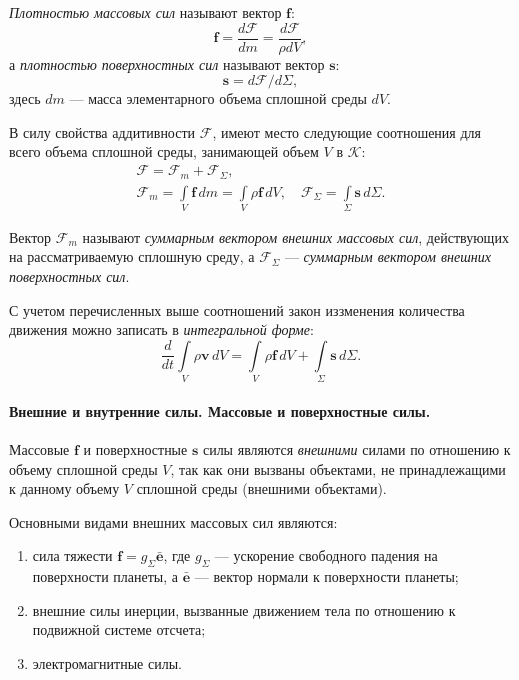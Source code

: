 \begin{definition*}
	\textit{Плотностью массовых сил} называют вектор $\mathbf{f}$:
	\begin{equation*}
		\mathbf{f} = \frac{d\mathcal{F}}{dm} = \frac{d\mathcal{F}}{\rho dV},
	\end{equation*}
	а \textit{плотностью поверхностных сил} называют вектор $\mathbf{s}$:
	\begin{equation*}
		\mathbf{s} = d\mathcal{F} / d\Sigma,
	\end{equation*}
	здесь $dm$ --- масса элементарного объема сплошной среды $dV$.
	
	
	В силу свойства аддитивности $\mathcal{F}$, имеют место следующие соотношения для всего объема сплошной среды, занимающей объем $V$ в $\mathcal{K}$:
	\begin{gather*}
		\mathcal{F} = \mathcal{F}_m + \mathcal{F}_{\Sigma}, \\
		\mathcal{F}_m = \int\limits_{V} \mathbf{f} \, dm = \int\limits_{V} \rho \mathbf{f} \, dV, \quad \mathcal{F}_{\Sigma} = \int\limits_{\Sigma} \mathbf{s} \, d\Sigma.
	\end{gather*}
	
	Вектор $\mathcal{F}_m$ называют \textit{суммарным вектором внешних массовых сил}, действующих на рассматриваемую сплошную среду, а $\mathcal{F}_{\Sigma}$ --- \textit{суммарным вектором внешних поверхностных сил}.
\end{definition*}

С учетом перечисленных выше соотношений закон иззменения количества движения можно записать в \textit{интегральной форме}:
\begin{equation*}
	\frac{d}{dt} \int\limits_{V} \rho \mathbf{v} \, dV = \int\limits_{V} \rho \mathbf{f} \, dV + \int\limits_{\Sigma} \mathbf{s} \, d\Sigma.
\end{equation*}

\paragraph{Внешние и внутренние силы. Массовые и поверхностные силы.} Массовые $\mathbf{f}$ и поверхностные $\mathbf{s}$ силы являются \textit{внешними} силами по отношению к объему сплошной среды $V$, так как они вызваны объектами, не принадлежащими к данному объему $V$ сплошной среды (внешними объектами). 

Основными видами внешних массовых сил являются: 
\begin{enumerate}
	\item сила тяжести $\mathbf{f} = g_{\Sigma} \bar{\mathbf{e}}$, где $g_{\Sigma}$ --- ускорение свободного падения на поверхности планеты, а $\bar{\mathbf{e}}$ --- вектор нормали к поверхности планеты;
	
	\item внешние силы инерции, вызванные движением тела по отношению к подвижной системе отсчета;
	
	\item электромагнитные силы. 
\end{enumerate}

